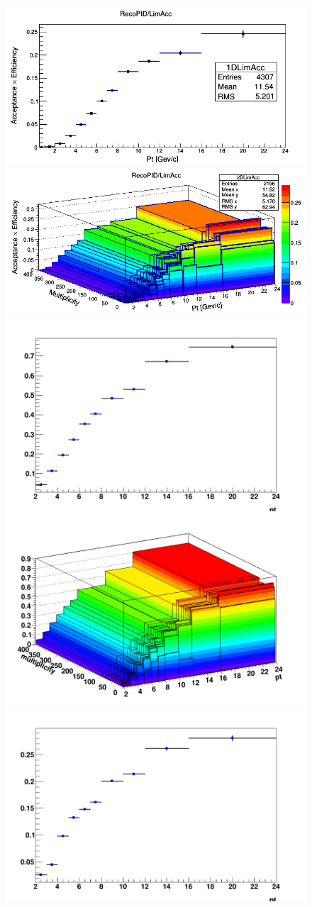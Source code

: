 \begin{figure}[h]   %
	\centering
		\includegraphics[width=.48\linewidth]{figures/Effs/EfficiencyMap_1D_DPlus_b_Ref_wLimAcc_Plot.png}  %
	\includegraphics[width=.48\linewidth]{figures/Effs/EfficiencyMap_2D_DPlus_b_Ref_wLimAcc_Plot.png} 
	\includegraphics[width=.48\linewidth]{figures/Effs/EfficiencyMap_1D_DStar_b_Ref_wLimAcc_Plot.png}  %
	\includegraphics[width=.48\linewidth]{figures/Effs/EfficiencyMap_2D_DStar_b_Ref_wLimAcc_Plot.png} 
	\includegraphics[width=.48\linewidth]{figures/Effs/EfficiencyMap_1D_Dzero_b_Ref_wLimAcc_Plot.png}  %

\end{figure}
